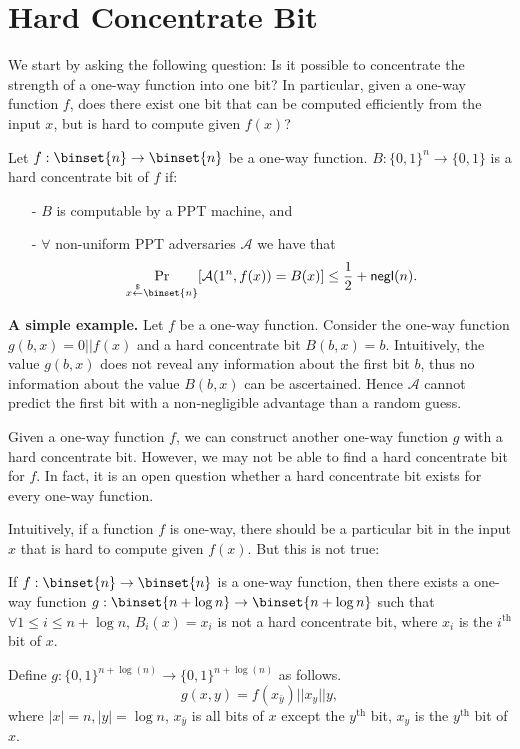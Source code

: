 \documentclass[12pt]{tufte-book}
\begin{document}
\iffalse
\section{Hard Concentrate Bit}
We start by asking the following question: Is it possible to concentrate the strength of a one-way function into one bit? In particular, given a one-way function $f$, does there exist one bit that can be computed efficiently from the input $x$, but is hard to compute given $f(x)$?
\begin{definition}
Let $f:\binset{n} \rightarrow \binset{n}$ be a one-way function.
$B:\{0,1\}^n \rightarrow \{0,1\}$ is a hard concentrate bit of $f$ if:
\begin{itemize}
\item[-] $B$ is computable by a PPT machine, and
\item[-] $\forall$ non-uniform PPT adversaries $\mathcal{A}$ we have that
	$$\Pr_{x\stackrel{\$}{\leftarrow} \binset{n}}[\mathcal{A}(1^n, f(x)) = B(x)] \leq \frac{1}{2} + \mathsf{negl}(n).$$
\end{itemize}
\end{definition}

\noindent\textbf{A simple example.}
Let $f$ be a one-way function. Consider the one-way function $g(b, x) = 0 || f(x)$ and a hard concentrate bit $B(b, x) = b$.
Intuitively, the value $g(b, x)$ does not reveal any information about the first bit $b$, thus no information about the value $B(b, x)$ can be ascertained. Hence $\mathcal{A}$ cannot predict the first bit with a non-negligible advantage than a random guess.
\begin{remark}
Given a one-way function $f$, we can construct another one-way function $g$ with a hard concentrate bit. However, we may not be able to find a hard concentrate bit for $f$. In fact, it is an open question whether a hard concentrate bit exists for every one-way function.
\end{remark}


\bigskip
Intuitively, if a function $f$ is one-way, there should be a particular bit in the input $x$ that is hard to compute given $f(x)$. But this is not true:
\begin{claim}
If $f:\binset{n}\rightarrow \binset{n}$ is a one-way function, then there exists a one-way function $g:\binset{n+\log n}\rightarrow\binset{n+\log n}$ such that $\forall 1 \leq i \leq n+\log n$, $B_i(x) = x_i$ is not a hard concentrate bit, where $x_i$ is the $i^\text{th}$ bit of $x$.
\end{claim}
\proof
Define $g:\{0,1\}^{n+\log(n)} \rightarrow \{0,1\}^{n+\log(n)}$ as follows.
$$g(x,y) = f(x_{\bar y}) || x_y || y,$$
where $|x| = n, |y| = \log n$, $x_{\bar y}$ is all bits of $x$ except the $y^\text{th}$ bit, $x_y$ is the $y^\text{th}$ bit of $x$.
\end{document}
